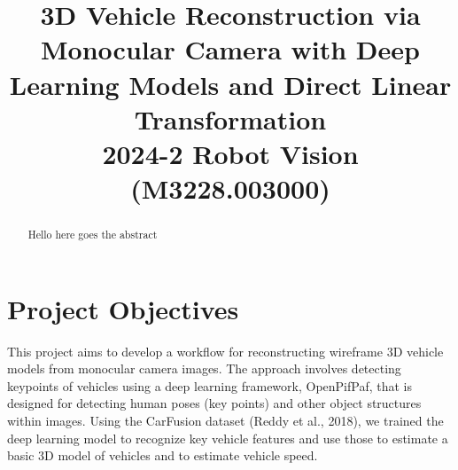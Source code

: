 \documentclass[conference]{IEEEtran}
\begin{document}
\title{3D Vehicle Reconstruction via Monocular Camera with Deep Learning Models and Direct Linear Transformation\\
{\footnotesize 2024-2 Robot Vision (M3228.003000)}
}

\author{
    \and
    \and
}

\maketitle

\begin{abstract}
    Hello here goes the abstract
\end{abstract}

\section{Project Objectives}

This project aims to develop a workflow for reconstructing wireframe 3D vehicle models from monocular camera images. The approach involves detecting keypoints of vehicles using a deep learning framework, OpenPifPaf, that is designed for detecting human poses (key points) and other object structures within images. Using the CarFusion dataset (Reddy et al., 2018), we trained the deep learning model to recognize key vehicle features and use those to estimate a basic 3D model of vehicles and to estimate vehicle speed. 
\end{document}
